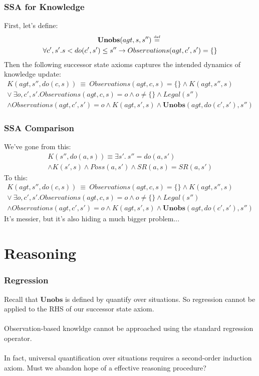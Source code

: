 \documentclass{beamer}
\newcommand{\isdef}{\hbox{$\stackrel{\mbox{\tiny def}}{=}$}}
\begin{document}
\begin{frame}
\frametitle{SSA for Knowledge}
First, let's define:
\begin{multline*}
  \mathbf{Unobs}(agt,s,s'')\ \isdef\ \\
    \forall c',s' . s < do(c',s') \leq s'' \rightarrow Observations(agt,c',s') = \{\}
\end{multline*}
\pause
Then the following successor state axioms captures the intended dynamics of
knowledge update:
\begin{multline*}
  K(agt,s'',do(c,s))\ \equiv\ Observations(agt,c,s) = \{\} \wedge K(agt,s'',s)\\
  \vee\ \exists o,c',s'.Observations(agt,c,s) = o \wedge o  \neq \{\} \wedge Legal(s'') \\
  \wedge Observations(agt,c',s')= o \wedge K(agt,s',s) \wedge \mathbf{Unobs}(agt,do(c',s'),s'')
\end{multline*}
\end{frame}

\begin{frame}
\frametitle{SSA Comparison}
We've gone from this:
\begin{multline*}
 K(s'',do(a,s)) \equiv \exists s' . \ s''=do(a,s') \\
 \wedge K(s',s) \wedge Poss(a,s') \wedge SR(a,s) = SR(a,s')
\end{multline*}
\pause
To this:
\begin{multline*}
  K(agt,s'',do(c,s))\ \equiv\ Observations(agt,c,s) = \{\} \wedge K(agt,s'',s)\\
  \vee\ \exists o,c',s'.Observations(agt,c,s) = o \wedge o  \neq \{\} \wedge Legal(s'') \\
  \wedge Observations(agt,c',s')= o \wedge K(agt,s',s) \wedge \mathbf{Unobs}(agt,do(c',s'),s'')
\end{multline*}
\pause
It's messier, but it's also hiding a much bigger problem...
\end{frame}

\section{Reasoning}

\begin{frame}
\frametitle{Regression}
Recall that $\mathbf{Unobs}$ is defined by quantify over situations.
So regression cannot be applied to the RHS of our successor state axiom.
\ \\
\ \\
Observation-based knowldge \alert{cannot} be approached using
the standard regression operator.
\ \\
\ \\
\pause
In fact, universal quantification over situations requires a
second-order induction axiom.
Must we abandon hope of a effective reasoning procedure?
\end{frame}
\end{document}
